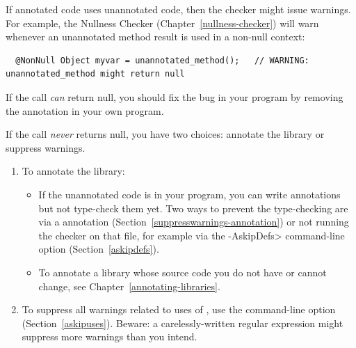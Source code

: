 If annotated code uses unannotated code, then the checker might issue
warnings.  For example, the Nullness Checker (Chapter~\ref{nullness-checker}) will
warn whenever an unannotated method result is used in a non-null context:

\begin{Verbatim}
  @NonNull Object myvar = unannotated_method();   // WARNING: unannotated_method might return null
\end{Verbatim}

If the call \emph{can} return null, you should fix the bug in your program by
removing the  annotation in your own program.

If the call \emph{never} returns null, you have two choices:  annotate the library
or suppress warnings.
\begin{enumerate}
\item To annotate the library:
  \begin{itemize}
  \item
    If the unannotated code is in your program, you can write annotations
    but not type-check them yet.  Two ways to prevent the type-checking are
    via a  annotation
    (Section~\ref{suppresswarnings-annotation}) or not running the
    checker on that file, for example via the \<-AskipDefs> command-line
    option (Section~\ref{askipdefs}).
  \item
    To annotate a library whose source code you do not have or cannot
    change, see Chapter~\ref{annotating-libraries}.
  \end{itemize}
\item To suppress all warnings related to uses of
  , use the  command-line option
  (Section~\ref{askipuses}).  Beware:  a carelessly-written regular
  expression might suppress more warnings than you intend.
\end{enumerate}


